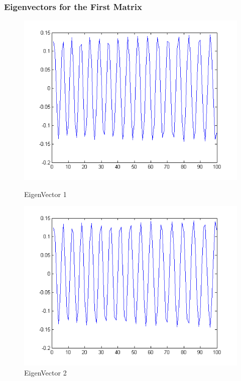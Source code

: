 \documentclass[12pt]{article}
\begin{document}
\subsubsection*{Eigenvectors for the First Matrix}
\begin{figure}[H]
	\begin{minipage}[b]{0.5\linewidth}
	\includegraphics[scale=.5]{v1p1.png}
	\caption{EigenVector 1}
	\end{minipage}
	\begin{minipage}[b]{0.5\linewidth}
	\includegraphics[scale=.5]{v1p2.png}
	\caption{EigenVector 2}
	\end{minipage}
\end{figure}
\end{document}
